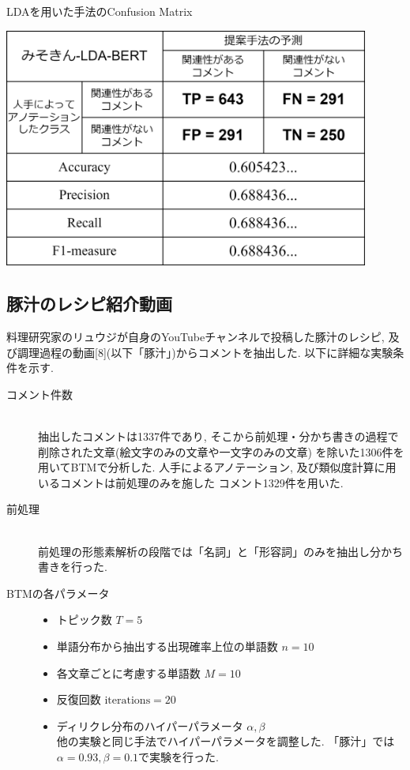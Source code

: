 \documentclass{ltjarticle}
\begin{document}
\vspace{10truept}

\begin{table}[h]
    \centering
    \caption{LDAを用いた手法のConfusion Matrix}
    \vspace{5truept}

    \includegraphics[width = 12cm]{images/みそきんLDA.drawio.png}
    \label{table:みそきんLDA_Confusion}
\end{table}

\subsection{豚汁のレシピ紹介動画}
料理研究家のリュウジが自身のYouTubeチャンネルで投稿した豚汁のレシピ, 及び調理過程の動画[8](以下「豚汁」)からコメントを抽出した. 
以下に詳細な実験条件を示す. 
\begin{description}
    \item[コメント件数]\mbox{}\\
    抽出したコメントは1337件であり, そこから前処理・分かち書きの過程で削除された文章(絵文字のみの文章や一文字のみの文章)
    を除いた1306件を用いてBTMで分析した. 人手によるアノテーション, 及び類似度計算に用いるコメントは前処理のみを施した
    コメント1329件を用いた. 

    \item[前処理] \mbox{}\\
    前処理の形態素解析の段階では「名詞」と「形容詞」のみを抽出し分かち書きを行った. 
    \item[BTMの各パラメータ]\mbox{}
    \begin{itemize}
        \item トピック数 $T=5$
        \item 単語分布から抽出する出現確率上位の単語数 $n = 10$
        \item 各文章ごとに考慮する単語数 $M=10$
        \item 反復回数 $\textrm{iterations} = 20$
        \item ディリクレ分布のハイパーパラメータ $\alpha, \beta$\\
        他の実験と同じ手法でハイパーパラメータを調整した. 
        「豚汁」では$\alpha = 0.93, \beta = 0.1$で実験を行った. 
    \end{itemize}
\end{description}
\end{document}
